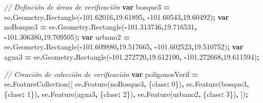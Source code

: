 \documentclass[
  12pt,
  letterpaper,
  twoside]{book}
\newenvironment{Shaded}{\begin{snugshade}}{\end{snugshade}}
\newcommand{\AttributeTok}[1]{\textcolor[rgb]{0.77,0.63,0.00}{#1}}
\newcommand{\CommentTok}[1]{\textcolor[rgb]{0.56,0.35,0.01}{\textit{#1}}}
\newcommand{\DecValTok}[1]{\textcolor[rgb]{0.00,0.00,0.81}{#1}}
\newcommand{\FloatTok}[1]{\textcolor[rgb]{0.00,0.00,0.81}{#1}}
\newcommand{\FunctionTok}[1]{\textcolor[rgb]{0.00,0.00,0.00}{#1}}
\newcommand{\KeywordTok}[1]{\textcolor[rgb]{0.13,0.29,0.53}{\textbf{#1}}}
\newcommand{\NormalTok}[1]{#1}
\newcommand{\OperatorTok}[1]{\textcolor[rgb]{0.81,0.36,0.00}{\textbf{#1}}}
\newcommand{\StringTok}[1]{\textcolor[rgb]{0.31,0.60,0.02}{#1}}
\begin{document}
\begin{Shaded}
\begin{Highlighting}[]
\CommentTok{// Definción de áreas de verificación}
\KeywordTok{var}\NormalTok{ bosque3 }\OperatorTok{=}\NormalTok{ ee}\OperatorTok{.}\AttributeTok{Geometry}\OperatorTok{.}\FunctionTok{Rectangle}\NormalTok{(}\OperatorTok{{-}}\FloatTok{101.62016}\OperatorTok{,}\FloatTok{19.61895}\OperatorTok{,} 
  \OperatorTok{{-}}\FloatTok{101.60543}\OperatorTok{,}\FloatTok{19.60492}\NormalTok{)}\OperatorTok{;}
\KeywordTok{var}\NormalTok{ noBosque3 }\OperatorTok{=}\NormalTok{ ee}\OperatorTok{.}\AttributeTok{Geometry}\OperatorTok{.}\FunctionTok{Rectangle}\NormalTok{(}\OperatorTok{{-}}\FloatTok{101.313746}\OperatorTok{,}\FloatTok{19.716531}\OperatorTok{,} 
  \OperatorTok{{-}}\FloatTok{101.306380}\OperatorTok{,}\FloatTok{19.709505}\NormalTok{)}\OperatorTok{;}
\KeywordTok{var}\NormalTok{ urbano2 }\OperatorTok{=}\NormalTok{ ee}\OperatorTok{.}\AttributeTok{Geometry}\OperatorTok{.}\FunctionTok{Rectangle}\NormalTok{(}\OperatorTok{{-}}\FloatTok{101.609880}\OperatorTok{,}\FloatTok{19.517665}\OperatorTok{,} 
  \OperatorTok{{-}}\FloatTok{101.602523}\OperatorTok{,}\FloatTok{19.510752}\NormalTok{)}\OperatorTok{;}
\KeywordTok{var}\NormalTok{ agua3 }\OperatorTok{=}\NormalTok{ ee}\OperatorTok{.}\AttributeTok{Geometry}\OperatorTok{.}\FunctionTok{Rectangle}\NormalTok{(}\OperatorTok{{-}}\FloatTok{101.272720}\OperatorTok{,}\FloatTok{19.612100}\OperatorTok{,} 
  \OperatorTok{{-}}\FloatTok{101.272668}\OperatorTok{,}\FloatTok{19.611594}\NormalTok{)}\OperatorTok{;}

\CommentTok{// Creación de colección de verificación}
\KeywordTok{var}\NormalTok{ poligonosVerif }\OperatorTok{=}\NormalTok{ ee}\OperatorTok{.}\FunctionTok{FeatureCollection}\NormalTok{([}
\NormalTok{  ee}\OperatorTok{.}\FunctionTok{Feature}\NormalTok{(noBosque3}\OperatorTok{,}\NormalTok{ \{}\StringTok{\textquotesingle{}clase\textquotesingle{}}\OperatorTok{:} \DecValTok{0}\NormalTok{\})}\OperatorTok{,}
\NormalTok{  ee}\OperatorTok{.}\FunctionTok{Feature}\NormalTok{(bosque3}\OperatorTok{,}\NormalTok{ \{}\StringTok{\textquotesingle{}clase\textquotesingle{}}\OperatorTok{:} \DecValTok{1}\NormalTok{\})}\OperatorTok{,}
\NormalTok{  ee}\OperatorTok{.}\FunctionTok{Feature}\NormalTok{(agua3}\OperatorTok{,}\NormalTok{ \{}\StringTok{\textquotesingle{}clase\textquotesingle{}}\OperatorTok{:} \DecValTok{2}\NormalTok{\})}\OperatorTok{,}
\NormalTok{  ee}\OperatorTok{.}\FunctionTok{Feature}\NormalTok{(urbano2}\OperatorTok{,}\NormalTok{ \{}\StringTok{\textquotesingle{}clase\textquotesingle{}}\OperatorTok{:} \DecValTok{3}\NormalTok{\})}\OperatorTok{,}
\NormalTok{])}\OperatorTok{;}
\end{Highlighting}
\end{Shaded}
\end{document}
